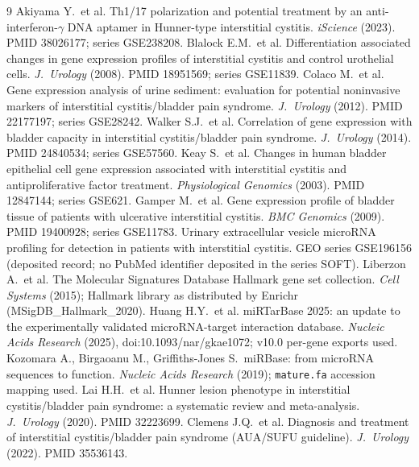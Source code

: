 \documentclass[11pt,a4paper]{article}
\begin{document}
\clearpage
\begin{thebibliography}{9}\small
{} Akiyama Y.\ et al. Th1/17 polarization and potential
treatment by an anti-interferon-$\gamma$ DNA aptamer in Hunner-type
interstitial cystitis. \emph{iScience} (2023). PMID 38026177; series GSE238208.
 Blalock E.M.\ et al. Differentiation associated changes
in gene expression profiles of interstitial cystitis and control urothelial
cells. \emph{J.\ Urology} (2008). PMID 18951569; series GSE11839.
 Colaco M.\ et al. Gene expression analysis of urine
sediment: evaluation for potential noninvasive markers of interstitial
cystitis/bladder pain syndrome. \emph{J.\ Urology} (2012). PMID 22177197;
series GSE28242.
 Walker S.J.\ et al. Correlation of gene expression with
bladder capacity in interstitial cystitis/bladder pain syndrome.
\emph{J.\ Urology} (2014). PMID 24840534; series GSE57560.
 Keay S.\ et al. Changes in human bladder epithelial cell
gene expression associated with interstitial cystitis and antiproliferative
factor treatment. \emph{Physiological Genomics} (2003). PMID 12847144; series
GSE621.
 Gamper M.\ et al. Gene expression profile of bladder
tissue of patients with ulcerative interstitial cystitis. \emph{BMC Genomics}
(2009). PMID 19400928; series GSE11783.
 Urinary extracellular vesicle microRNA profiling for
detection in patients with interstitial cystitis. GEO series GSE196156
(deposited record; no PubMed identifier deposited in the series SOFT).
 Liberzon A.\ et al. The Molecular Signatures Database
Hallmark gene set collection. \emph{Cell Systems} (2015); Hallmark library as
distributed by Enrichr (MSigDB\_Hallmark\_2020).
 Huang H.Y.\ et al. miRTarBase 2025: an update to the
experimentally validated microRNA-target interaction database. \emph{Nucleic
Acids Research} (2025), doi:10.1093/nar/gkae1072; v10.0 per-gene exports used.
 Kozomara A., Birgaoanu M., Griffiths-Jones S.\ miRBase:
from microRNA sequences to function. \emph{Nucleic Acids Research} (2019);
\texttt{mature.fa} accession mapping used.
 Lai H.H.\ et al. Hunner lesion phenotype in interstitial
cystitis/bladder pain syndrome: a systematic review and meta-analysis.
\emph{J.\ Urology} (2020). PMID 32223699.
 Clemens J.Q.\ et al. Diagnosis and treatment of
interstitial cystitis/bladder pain syndrome (AUA/SUFU guideline).
\emph{J.\ Urology} (2022). PMID 35536143.

\end{thebibliography}
\end{document}
